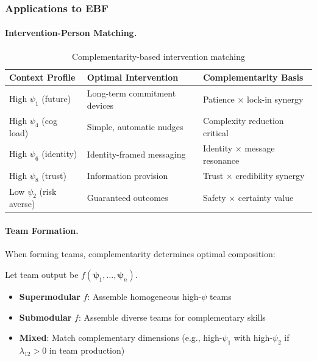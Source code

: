 \subsubsection{Applications to EBF}

\paragraph{Intervention-Person Matching.}

\begin{table}[h]
\centering
\small
\begin{tabular}{p{3cm}p{4cm}p{5cm}}
\toprule
\textbf{Context Profile} & \textbf{Optimal Intervention} & \textbf{Complementarity Basis} \\
\midrule
High $\psi_1$ (future) & Long-term commitment devices & Patience × lock-in synergy \\
High $\psi_4$ (cog load) & Simple, automatic nudges & Complexity reduction critical \\
High $\psi_6$ (identity) & Identity-framed messaging & Identity × message resonance \\
High $\psi_8$ (trust) & Information provision & Trust × credibility synergy \\
Low $\psi_2$ (risk averse) & Guaranteed outcomes & Safety × certainty value \\
\bottomrule
\end{tabular}
\caption{Complementarity-based intervention matching}
\label{tab:intervention-matching}
\end{table}

\paragraph{Team Formation.}

When forming teams, complementarity determines optimal composition:

\begin{proposition}
\label{prop:team-comp}
Let team output be $f(\boldsymbol{\psi}_1, \ldots, \boldsymbol{\psi}_n)$. 
\begin{itemize}
    \item \textbf{Supermodular} $f$: Assemble homogeneous high-$\psi$ teams
    \item \textbf{Submodular} $f$: Assemble diverse teams for complementary skills
    \item \textbf{Mixed}: Match complementary dimensions (e.g., high-$\psi_1$ with 
    high-$\psi_2$ if $\lambda_{12} > 0$ in team production)
\end{itemize}
\end{proposition}

